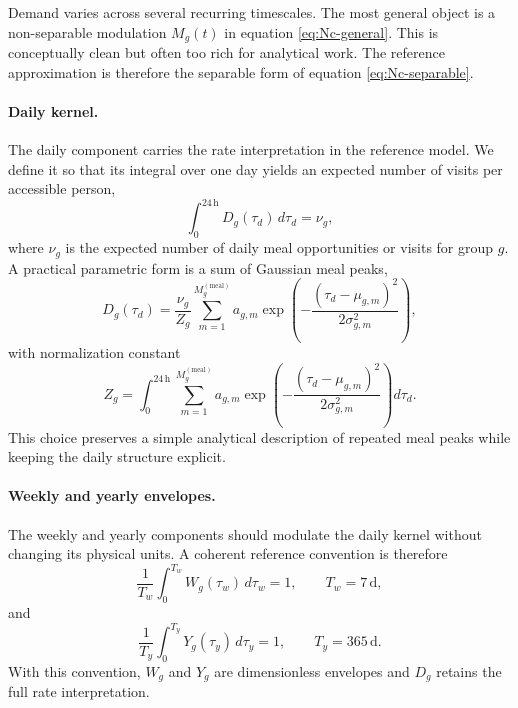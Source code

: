 \documentclass{article}
\begin{document}
Demand varies across several recurring timescales. The most general object is a non-separable modulation \( M_g(t) \) in equation \ref{eq:Nc-general}. This is conceptually clean but often too rich for analytical work. The reference approximation is therefore the separable form of equation \ref{eq:Nc-separable}.

\paragraph{Daily kernel.}
The daily component carries the rate interpretation in the reference model. We define it so that its integral over one day yields an expected number of visits per accessible person,
\begin{equation}
\label{eq:D-normalization}
    \int_0^{24\,\mathrm{h}} D_g(\tau_d) \, d\tau_d = \nu_g,
\end{equation}
where \( \nu_g \) is the expected number of daily meal opportunities or visits for group \( g \). A practical parametric form is a sum of Gaussian meal peaks,
\begin{equation}
\label{eq:D-gaussian}
    D_g(\tau_d) = \frac{\nu_g}{Z_g} \sum_{m=1}^{M_g^{(\mathrm{meal})}} a_{g,m} \exp\left(-\frac{(\tau_d - \mu_{g,m})^2}{2 \sigma_{g,m}^2}\right),
\end{equation}
with normalization constant
\begin{equation}
\label{eq:D-Z}
    Z_g = \int_0^{24\,\mathrm{h}} \sum_{m=1}^{M_g^{(\mathrm{meal})}} a_{g,m} \exp\left(-\frac{(\tau_d - \mu_{g,m})^2}{2 \sigma_{g,m}^2}\right) d\tau_d.
\end{equation}
This choice preserves a simple analytical description of repeated meal peaks while keeping the daily structure explicit.

\paragraph{Weekly and yearly envelopes.}
The weekly and yearly components should modulate the daily kernel without changing its physical units. A coherent reference convention is therefore
\begin{equation}
\label{eq:W-normalization}
    \frac{1}{T_w} \int_0^{T_w} W_g(\tau_w) \, d\tau_w = 1, \qquad T_w = 7\,\mathrm{d},
\end{equation}
and
\begin{equation}
\label{eq:Y-normalization}
    \frac{1}{T_y} \int_0^{T_y} Y_g(\tau_y) \, d\tau_y = 1, \qquad T_y = 365\,\mathrm{d}.
\end{equation}
With this convention, \( W_g \) and \( Y_g \) are dimensionless envelopes and \( D_g \) retains the full rate interpretation.
\end{document}
